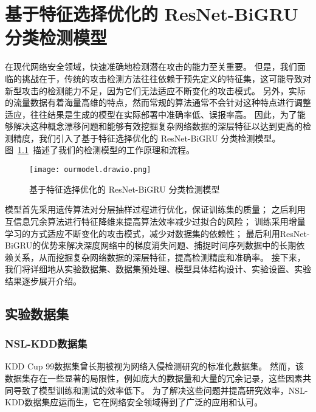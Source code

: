 \chapter{基于特征选择优化的 ResNet-BiGRU 分类检测模型}

\label{cha:ResNet-BiGRU}

在现代网络安全领域，快速准确地检测潜在攻击的能力至关重要。
但是，我们面临的挑战在于，传统的攻击检测方法往往依赖于预先定义的特征集，这可能导致对新型攻击的检测能力不足，因为它们无法适应不断变化的攻击模式。
另外，实际的流量数据有着海量高维的特点，然而常规的算法通常不会针对这种特点进行调整适应，往往结果是生成的模型在实际部署中准确率低、误报率高。
因此，为了能够解决这种概念漂移问题和能够有效挖掘复杂网络数据的深层特征以达到更高的检测精度，我们引入了基于特征选择优化的 ResNet-BiGRU 分类检测模型。
图~\ref{fig:attack_detecion_model}~描述了我们的检测模型的工作原理和流程。
\begin{figure}[htbp]
  \centering
  \texttt{[image: ourmodel.drawio.png]}
  \caption{基于特征选择优化的 ResNet-BiGRU 分类检测模型}
  \label{fig:attack_detecion_model}
\end{figure}


模型首先采用遗传算法对分层抽样过程进行优化，保证训练集的质量；
之后利用互信息冗余算法进行特征降维来提高算法效率减少过拟合的风险；
训练采用增量学习的方式适应不断变化的攻击模式，减少对数据集的依赖性；
最后利用ResNet-BiGRU的优势来解决深度网络中的梯度消失问题、捕捉时间序列数据中的长期依赖关系，从而挖掘复杂网络数据的深层特征，提高检测精度和准确率。
接下来，我们将详细地从实验数据集、数据集预处理、模型具体结构设计、实验设置、实验结果逐步展开介绍。

\section{实验数据集}
\subsection{NSL-KDD数据集\cite{revathi2013detailed}}
KDD Cup 99数据集\cite{tavallaee2009detailed}曾长期被视为网络入侵检测研究的标准化数据集。
然而，该数据集存在一些显著的局限性，例如庞大的数据量和大量的冗余记录，这些因素共同导致了模型训练和测试的效率低下。
为了解决这些问题并提高研究效率，NSL-KDD数据集应运而生，它在网络安全领域得到了广泛的应用和认可。


